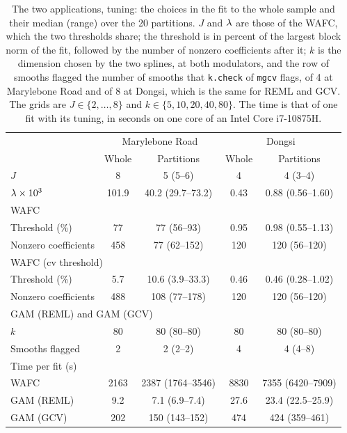 \begin{table}[tp]
\caption{The two applications, tuning: the choices in the fit to the whole
sample and their median (range) over the 20 partitions. $J$ and $\lambda$ are
those of the WAFC, which the two thresholds share; the threshold is in
percent of the largest block norm of the fit, followed by the number of
nonzero coefficients after it; $k$ is the dimension chosen by the two
splines, at both modulators, and the  row
of smooths flagged the number of smooths that
\texttt{k.check} of \texttt{mgcv} flags, of 4 at Marylebone Road and of 8 at
Dongsi, which is the same for REML and GCV. The grids are
$J \in \{2,\dots,8\}$ and $k \in \{5,10,20,40,80\}$. The time is that of
one fit with its tuning, in seconds on one core of an Intel Core i7-10875H.}
\label{tab:app-tuning}
\centering
\small
\begin{tabular}{lcccc}
\hline
 & \multicolumn{2}{c}{Marylebone Road} & \multicolumn{2}{c}{Dongsi} \\
 & Whole & Partitions & Whole & Partitions \\
\hline
$J$ & 8 & 5 (5--6) & 4 & 4 (3--4) \\
$\lambda \times 10^{3}$ & 101.9 & 40.2 (29.7--73.2) & 0.43 & 0.88 (0.56--1.60) \\
\multicolumn{5}{l}{WAFC} \\
\quad Threshold (\%) & 77 & 77 (56--93) & 0.95 & 0.98 (0.55--1.13) \\
\quad Nonzero coefficients & 458 & 77 (62--152) & 120 & 120 (56--120) \\
\multicolumn{5}{l}{WAFC (cv threshold)} \\
\quad Threshold (\%) & 5.7 & 10.6 (3.9--33.3) & 0.46 & 0.46 (0.28--1.02) \\
\quad Nonzero coefficients & 488 & 108 (77--178) & 120 & 120 (56--120) \\
\multicolumn{5}{l}{GAM (REML) and GAM (GCV)} \\
\quad $k$ & 80 & 80 (80--80) & 80 & 80 (80--80) \\
\quad Smooths flagged & 2 & 2 (2--2) & 4 & 4 (4--8) \\
\multicolumn{5}{l}{Time per fit (s)} \\
\quad WAFC & 2163 & 2387 (1764--3546) & 8830 & 7355 (6420--7909) \\
\quad GAM (REML) & 9.2 & 7.1 (6.9--7.4) & 27.6 & 23.4 (22.5--25.9) \\
\quad GAM (GCV) & 202 & 150 (143--152) & 474 & 424 (359--461) \\
\hline
\end{tabular}
\end{table}
